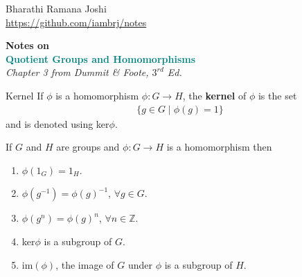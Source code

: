 \documentclass[titlepage, 12pt]{article}
\begin{document}
\begin{titlepage} %

	\raggedleft%

	\vspace*{\baselineskip} %

	{Bharathi Ramana Joshi\\\url{https://github.com/iambrj/notes}} %

	\vspace*{0.167\textheight} %

	\textbf{\LARGE Notes on}\\[\baselineskip] %

	\textbf{\textcolor{teal}{\huge Quotient Groups and Homomorphisms}}\\[\baselineskip] %

    {\Large \textit{Chapter 3 from Dummit \& Foote, $3^{rd}$ Ed.}} %

	\vfill %

	\vspace*{3\baselineskip} %

\end{titlepage}

\newpage

\begin{definition}{Kernel}{}
    If $\phi$ is a homomorphism $\phi:G\rightarrow H$, the \textbf{kernel} of
    $\phi$ is the set
    \begin{gather*}
        \{g\in G\mid\phi(g) = 1\}
    \end{gather*}
    and is denoted using ker$\phi$.
\end{definition}
If $G$ and $H$ are groups and $\phi:G\rightarrow H$ is a homomorphism
then
\begin{enumerate}
    \item$\phi(1_G) = 1_H$.
    \item$\phi(g^{-1}) = \phi(g)^{-1}$, $\forall g\in G$.
    \item$\phi(g^n) = \phi(g)^n$, $\forall n\in\mathbb{Z}$.
    \item ker$\phi$ is a subgroup of $G$.
    \item im$(\phi)$, the image of $G$ under $\phi$ is a subgroup of $H$.
\end{enumerate}
\end{document}
